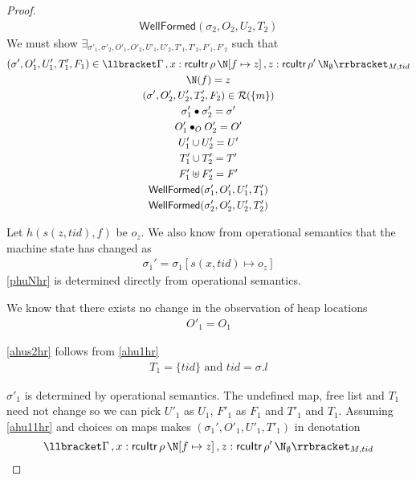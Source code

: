 \begin{proof}
\begin{gather}
\label{ahu17hr}
\textsf{WellFormed}(\sigma_2,O_{2},U_{2},T_{2})
\end{gather}
We must show $\exists_{\sigma'_1, \sigma'_2, O'_{1}, O'_{2}, U'_{1}, U'_{2}, T'_{1}, T'_{2},F'_1 ,F'_2}$ such that
\begin{gather}\label{phu5hr}
\begin{aligned}
(\sigma',O'_{1},U'_{1}, T'_{1},F_1)  \in \llbracket \Gamma\,,  x:\textsf{rcuItr} \, \rho \, \N[f\mapsto z]\, ,z:\textsf{rcuItr} \, \rho' \, \N_{\emptyset} \rrbracket_{M,tid}
\end{aligned}
\\
\label{phuNhr}
\N(f) = z
\\
\label{phu6hr}
(\sigma',O'_{2},U'_{2}, T'_{2}, F_2) \in \mathcal{R}(\{m\})
\\
\label{ahusighr'}
\sigma'_1 \bullet \sigma'_2 = \sigma'
\\
\label{phu7hr}
O'_{1} \bullet_{O} O'_{2} = O'
\\
\label{phu8hr}
U'_{1} \cup U'_{2} = U'
\\
\label{phu9hr}
T'_{1} \cup T'_{2} = T'
\\
\label{phuhrf}
F'_1 \uplus F'_2 = F'
\\
\label{phu10hr}
\textsf{WellFormed}(\sigma_1',O'_{1},U'_{1},T'_{1}) \\
\label{phu11hr}
\textsf{WellFormed}(\sigma_2',O'_{2},U'_{2},T'_{2})
\end{gather}

Let $h(s(z,tid),f)$ be $o_z$. We also know from operational semantics that the machine state has changed as
\begin{gather}\label{ahushr}
\sigma_1' =  \sigma_1[s(x,tid) \mapsto o_z]
\end{gather}
\ref{phuNhr} is determined directly from operational semantics.

We know that there exists no change in the observation of heap locations
\begin{gather}\label{ahus1hr}
O'_1 =  O_1
\end{gather}

\ref{ahus2hr} follows from \ref{ahu1hr}
\begin{gather}\label{ahus2hr}
  T_1 = \{tid\} \text{ and } tid = \sigma.l
\end{gather}

$\sigma'_1$ is determined by operational semantics. The undefined map, free list and $T_1$ need not change so we can pick $U'_1$ as $U_1$, $F'_1$ as $F_1$ and $T'_1$ and $T_1$. Assuming \ref{ahu11hr} and choices on maps makes $(\sigma_1',O'_{1},U'_{1}, T'_{1})$ in denotation
\[ \llbracket \Gamma\,,  x:\textsf{rcuItr} \, \rho \, \N[f\mapsto z]\, ,z:\textsf{rcuItr} \, \rho' \, \N_{\emptyset} \rrbracket_{M,tid}\]


\end{proof}
